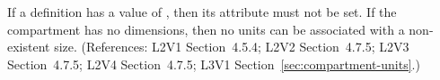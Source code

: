 If a \Compartment definition has a  value
of , then its  attribute must not be set. If the
compartment has no dimensions, then no units can be associated
with a non-existent size.  (References: L2V1 Section~4.5.4;
L2V2 Section~4.7.5; L2V3 Section~4.7.5; L2V4 Section~4.7.5; 
L3V1 Section~\ref{sec:compartment-units}.)
